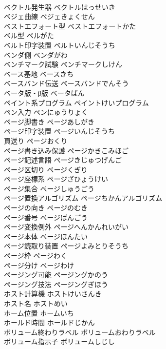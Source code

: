 \documentclass[8pt]{extreport}
\begin{document}
\begin{CJK}{UTF8}{min}
\\	ベクトル発生器	ベクトルはっせいき	
\\	ベジェ曲線	ベジェきょくせん	
\\	ベストエフォート型	ベストエフォートかた	
\\	ベル型	ベルがた	
\\	ベルト印字装置	ベルトいんじそうち	
\\	ベンダ側	ベンダがわ	
\\	ベンチマーク試験	ベンチマークしけん	
\\	ベース基地	ベースきち	
\\	ベースバンド伝送	ベースバンドでんそう	
\\	ベータ版・β版	ベータばん	
\\	ペイント系プログラム	ペイントけいプログラム	
\\	ペン入力	ペンにゅうりょく	
\\	ページ脚書き	ページあしがき	
\\	ページ印字装置	ページいんじそうち	
\\	頁送り	ページおくり	
\\	ページ書き込み保護	ページかきこみほご	
\\	ページ記述言語	ページきじゅつげんご	
\\	ページ区切り	ページくぎり	
\\	ページ座標系	ページざひょうけい	
\\	ページ集合	ページしゅうごう	
\\	ページ置換アルゴリズム	ページちかんアルゴリズム	
\\	ページの向き	ページのむき	
\\	ページ番号	ページばんごう	
\\	ページ変換例外	ページへんかんれいがい	
\\	ページ本体	ページほんたい	
\\	ページ読取り装置	ページよみとりそうち	
\\	ページ枠	ページわく	
\\	ページ分け	ページわけ	
\\	ページング可能	ページングかのう	
\\	ページング技法	ページングぎほう	
\\	ホスト計算機	ホストけいさんき	
\\	ホスト名	ホストめい	
\\	ホーム位置	ホームいち	
\\	ホールド時間	ホールドじかん	
\\	ボリューム終わりラベル	ボリュームおわりラベル	
\\	ボリューム指示子	ボリュームしじし	

\end{CJK}
\end{document}
